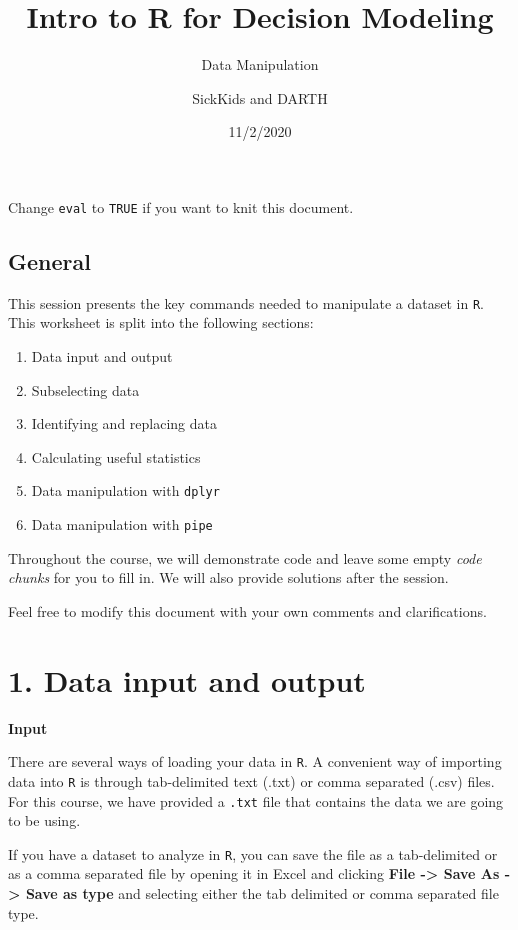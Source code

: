 \documentclass[
]{article}
\title{Intro to R for Decision Modeling}
\subtitle{Data Manipulation}
\author{SickKids and DARTH}
\date{11/2/2020}
\begin{document}
\maketitle

Change \texttt{eval} to \texttt{TRUE} if you want to knit this document.

\hypertarget{general}{%
\subsection{General}\label{general}}

This session presents the key commands needed to manipulate a dataset in
\texttt{R}. This worksheet is split into the following sections:

\begin{enumerate}
\def\labelenumi{\arabic{enumi}.}
\item
  Data input and output
\item
  Subselecting data
\item
  Identifying and replacing data
\item
  Calculating useful statistics
\item
  Data manipulation with \texttt{dplyr}
\item
  Data manipulation with \texttt{pipe}
\end{enumerate}

Throughout the course, we will demonstrate code and leave some empty
\emph{code chunks} for you to fill in. We will also provide solutions
after the session.

Feel free to modify this document with your own comments and
clarifications.

\hypertarget{data-input-and-output}{%
\section{1. Data input and output}\label{data-input-and-output}}

\textbf{Input}

There are several ways of loading your data in \texttt{R}. A convenient
way of importing data into \texttt{R} is through tab-delimited text
(.txt) or comma separated (.csv) files. For this course, we have
provided a \texttt{.txt} file that contains the data we are going to be
using.

If you have a dataset to analyze in \texttt{R}, you can save the file as
a tab-delimited or as a comma separated file by opening it in Excel and
clicking \textbf{File -\textgreater{} Save As -\textgreater{} Save as
type} and selecting either the tab delimited or comma separated file
type.
\end{document}
